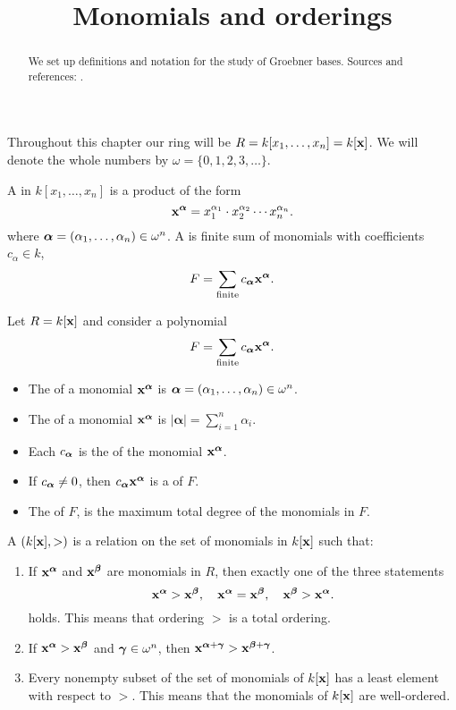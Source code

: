 \documentclass{ximera}
\title{Monomials and orderings}
\begin{document}
\begin{abstract}
  We set up definitions and notation for the study of Groebner
  bases. Sources and references: \cite{CLO2007}.
\end{abstract}
\maketitle

Throughout this chapter our ring will be $R=k[x_1,\dots,x_n] =
k[\mathbf{x}]$. We will denote the whole numbers by $\omega =
\{0,1,2,3,\dots\}$.


\begin{definition}
  A  in $k[x_1,\dots,x_n]$ is a product of the form
  \[
  \mathbf{x}^{{\boldsymbol\alpha}} = x_1^{\alpha_1}\cdot x_2^{\alpha_2}  \cdots x_n^{\alpha_n}.
  \]
  where ${\boldsymbol\alpha} = (\alpha_1,\dots,\alpha_n) \in
  \omega^n$.  A  is finite sum of monomials with
  coefficients $c_\alpha\in k$,
  \[
  F = \sum_{\mathrm{finite}} c_{{\boldsymbol\alpha}} \mathbf{x}^{{\boldsymbol\alpha}}.
  \]
\end{definition}


\begin{definition}
  Let $R = k[\mathbf{x}]$ and consider a polynomial
  \[
  F =  \sum_{\mathrm{finite}} c_{{\boldsymbol\alpha}} \mathbf{x}^{{\boldsymbol\alpha}}.
  \]
  \begin{itemize}
    \item The  of a monomial $\mathbf{x}^{{\boldsymbol\alpha}}$ is
      ${\boldsymbol\alpha}=(\alpha_1,\dots,\alpha_n)\in \omega^n$.
    \item The  of a monomial $\mathbf{x}^{{\boldsymbol\alpha}}$ is
      $|\boldsymbol{\alpha}| = \sum_{i=1}^n \alpha_i$.
    \item Each $c_{{\boldsymbol\alpha}}$ is the  of the
      monomial $\mathbf{x}^{{\boldsymbol\alpha}}$.
    \item If $c_{{\boldsymbol\alpha}} \ne 0$, then
      $c_{{\boldsymbol\alpha}}\mathbf{x}^{{\boldsymbol\alpha}}$ is a  of
      $F$.
    \item The  of $F$, is the maximum total degree
      of the monomials in $F$.
  \end{itemize}
\end{definition}



\begin{definition}
  A  $(k[\mathbf{x}],>)$ is a relation on the set of
  monomials in $k[\mathbf{x}]$ such that:
  \begin{enumerate}
  \item If $\mathbf{x}^{{\boldsymbol\alpha}}$ and $\mathbf{x}^{{\boldsymbol\beta}}$ are
    monomials in $R$, then exactly one of the three statements
      \[
      \mathbf{x}^{{\boldsymbol\alpha}} > \mathbf{x}^{{\boldsymbol\beta}},\quad \mathbf{x}^{{\boldsymbol\alpha}} = \mathbf{x}^{{\boldsymbol\beta}},
      \quad \mathbf{x}^{{\boldsymbol\beta}} > \mathbf{x}^{{\boldsymbol\alpha}}.
      \]
      holds. This means that ordering $>$ is a total ordering.
    \item If $\mathbf{x}^{{\boldsymbol\alpha}}>\mathbf{x}^{{\boldsymbol\beta}}$ and
      ${\boldsymbol\gamma}\in\omega^n$, then
      $\mathbf{x}^{{\boldsymbol\alpha}+{\boldsymbol\gamma}}>\mathbf{x}^{{\boldsymbol\beta}+{\boldsymbol\gamma}}$.
    \item Every nonempty subset of the set of monomials of $k[\mathbf{x}]$ has
      a least element with respect to $>$. This means that the
      monomials of $k[\mathbf{x}]$ are well-ordered.
  \end{enumerate}
\end{definition}
\end{document}
